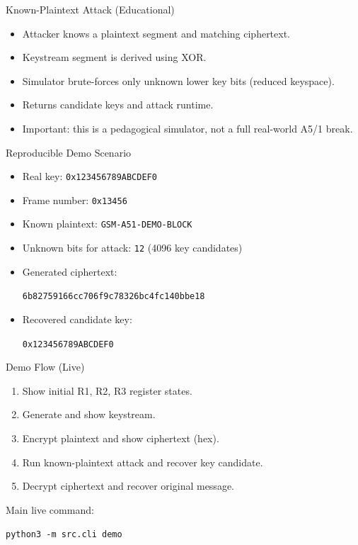 \documentclass[10pt]{beamer}
\begin{document}
\begin{frame}{Known-Plaintext Attack (Educational)}
\begin{itemize}
  \item Attacker knows a plaintext segment and matching ciphertext.
  \item Keystream segment is derived using XOR.
  \item Simulator brute-forces only unknown lower key bits (reduced keyspace).
  \item Returns candidate keys and attack runtime.
  \item Important: this is a pedagogical simulator, not a full real-world A5/1 break.
\end{itemize}
\end{frame}

\begin{frame}{Reproducible Demo Scenario}
\begin{itemize}
  \item Real key: \texttt{0x123456789ABCDEF0}
  \item Frame number: \texttt{0x13456}
  \item Known plaintext: \texttt{GSM-A51-DEMO-BLOCK}
  \item Unknown bits for attack: \texttt{12} (4096 key candidates)
  \item Generated ciphertext:
  \begin{center}
    \texttt{6b82759166cc706f9c78326bc4fc140bbe18}
  \end{center}
  \item Recovered candidate key:
  \begin{center}
    \texttt{0x123456789ABCDEF0}
  \end{center}
\end{itemize}
\end{frame}

\begin{frame}{Demo Flow (Live)}
\begin{enumerate}
  \item Show initial R1, R2, R3 register states.
  \item Generate and show keystream.
  \item Encrypt plaintext and show ciphertext (hex).
  \item Run known-plaintext attack and recover key candidate.
  \item Decrypt ciphertext and recover original message.
\end{enumerate}
\vspace{0.5em}
Main live command:
\begin{center}
  \texttt{python3 -m src.cli demo}
\end{center}
\end{frame}
\end{document}
